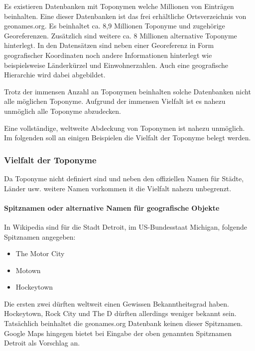			Es existieren Datenbanken mit Toponymen welche Millionen von Einträgen beinhalten.
			Eine dieser Datenbanken ist das frei erhältliche Ortsverzeichnis von geonames.org.
			Es beinhaltet ca. 8,9 Millionen Toponyme und zugehörige Georeferenzen.
			Zusätzlich sind weitere ca. 8 Millionen alternative Toponyme hinterlegt.
			In den Datensätzen sind neben einer Georeferenz in Form geografischer Koordinaten noch andere Informationen hinterlegt wie beispielsweise Länderkürzel und Einwohnerzahlen. 
			Auch eine geografische Hierarchie wird dabei abgebildet.

			Trotz der immensen Anzahl an Toponymen beinhalten solche Datenbanken nicht alle möglichen Toponyme.
			Aufgrund der immensen Vielfalt ist es nahezu unmöglich alle Toponyme abzudecken. 

			Eine vollständige, weltweite Abdeckung von Toponymen ist nahezu unmöglich.
			Im folgenden soll an einigen Beispielen die Vielfalt der Toponyme belegt werden.

			\subsubsection*{Vielfalt der Toponyme} 

				Da Toponyme nicht definiert sind und neben den offiziellen Namen für Städte, Länder usw. weitere Namen vorkommen it die Vielfalt nahezu unbegrenzt.
				


				\paragraph{Spitznamen oder alternative Namen für geografische Objekte} 
					In Wikipedia sind für die Stadt Detroit, im US-Bundesstaat Michigan, folgende Spitznamen angegeben:
					
					\begin{itemize}
						\item The Motor City
						\item Motown
						\item Hockeytown
					\end{itemize}

					Die ersten zwei dürften weltweit einen Gewissen Bekanntheitsgrad haben. 
					Hockeytown, Rock City und The D dürften allerdings weniger bekannt sein.
					Tatsächlich beinhaltet die geonames.org Datenbank keinen dieser Spitznamen.
					Google Maps hingegen bietet bei Eingabe der oben genannten Spitznamen Detroit als Vorschlag an.

